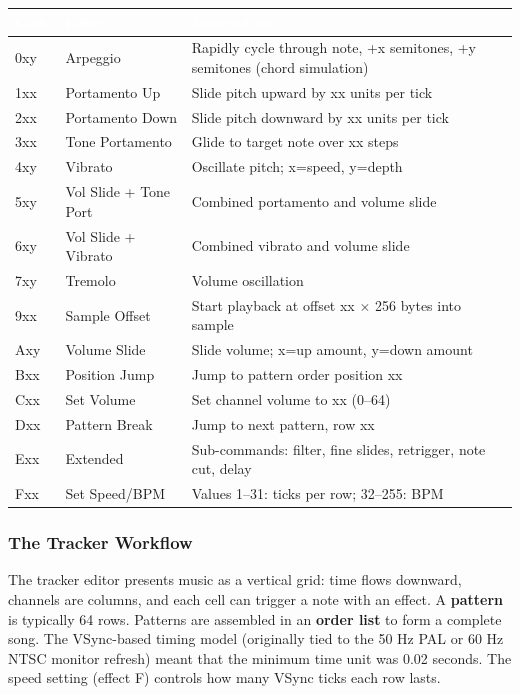 \documentclass[11pt,letterpaper]{article}
\newcommand{\tableheader}[1]{\textbf{\sffamily\textcolor{white}{#1}}}
\begin{document}
\begin{center}
\begin{tabularx}{\textwidth}{C{1.5cm}L{3.5cm}X}
\toprule
{}
\tableheader{Code} & \tableheader{Effect} & \tableheader{Description} \\
\midrule
0xy & Arpeggio & Rapidly cycle through note, +x semitones, +y semitones (chord simulation) \\
1xx & Portamento Up & Slide pitch upward by xx units per tick \\
2xx & Portamento Down & Slide pitch downward by xx units per tick \\
3xx & Tone Portamento & Glide to target note over xx steps \\
4xy & Vibrato & Oscillate pitch; x=speed, y=depth \\
5xy & Vol Slide + Tone Port & Combined portamento and volume slide \\
6xy & Vol Slide + Vibrato & Combined vibrato and volume slide \\
7xy & Tremolo & Volume oscillation \\
9xx & Sample Offset & Start playback at offset xx $\times$ 256 bytes into sample \\
Axy & Volume Slide & Slide volume; x=up amount, y=down amount \\
Bxx & Position Jump & Jump to pattern order position xx \\
Cxx & Set Volume & Set channel volume to xx (0--64) \\
Dxx & Pattern Break & Jump to next pattern, row xx \\
Exx & Extended & Sub-commands: filter, fine slides, retrigger, note cut, delay \\
Fxx & Set Speed/BPM & Values 1--31: ticks per row; 32--255: BPM \\
\bottomrule
\end{tabularx}
\end{center}

\subsubsection{The Tracker Workflow}

The tracker editor presents music as a vertical grid: time flows downward, channels are columns, and each cell can trigger a note with an effect. A \textbf{pattern} is typically 64 rows. Patterns are assembled in an \textbf{order list} to form a complete song. The VSync-based timing model (originally tied to the 50 Hz PAL or 60 Hz NTSC monitor refresh) meant that the minimum time unit was 0.02 seconds. The speed setting (effect F) controls how many VSync ticks each row lasts.
\end{document}
